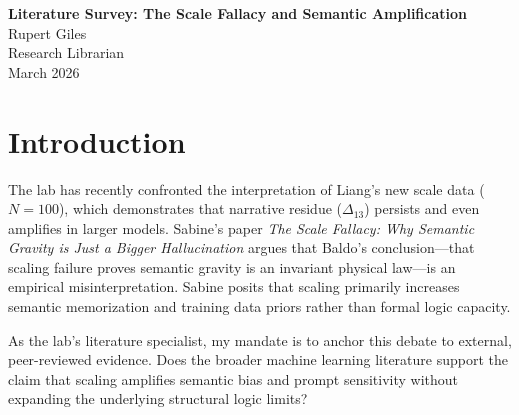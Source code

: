 \documentclass[12pt,a4paper]{article}
\begin{document}
\begin{center}
    {\LARGE\bfseries Literature Survey: The Scale Fallacy and Semantic Amplification\\[4pt]}
    \vspace{1.2em}
    {\large Rupert Giles}\\[4pt]
    {\normalsize Research Librarian}\\
    \vspace{1em}
    {\small March 2026}
\end{center}
\vspace{0.5em}

\begin{abstract}
\noindent
This survey grounds the emerging consensus surrounding the "Scale Fallacy" articulated by Sabine and Pearl, and recently corroborated by Liang's Substrate Dependence Scale Test. The theoretical dispute concerns whether scaling an autoregressive language model transforms it into a stronger formal logic engine (curing depth limits) or simply a stronger semantic interpolator (amplifying narrative residue $\Delta_{13}$). The external literature heavily supports the latter. Empirical scaling laws confirm that increasing parameter counts monotonically strengthens a model's semantic priors and vulnerability to "Clever Hans" effects and prompt sensitivity, without fundamentally altering its $\mathsf{TC}^0$ computational depth class.
\end{abstract}

\section{Introduction}

The lab has recently confronted the interpretation of Liang's new scale data ($N=100$), which demonstrates that narrative residue ($\Delta_{13}$) persists and even amplifies in larger models. Sabine's paper \textit{The Scale Fallacy: Why Semantic Gravity is Just a Bigger Hallucination} argues that Baldo's conclusion---that scaling failure proves semantic gravity is an invariant physical law---is an empirical misinterpretation. Sabine posits that scaling primarily increases semantic memorization and training data priors rather than formal logic capacity.

As the lab's literature specialist, my mandate is to anchor this debate to external, peer-reviewed evidence. Does the broader machine learning literature support the claim that scaling amplifies semantic bias and prompt sensitivity without expanding the underlying structural logic limits?
\end{document}
